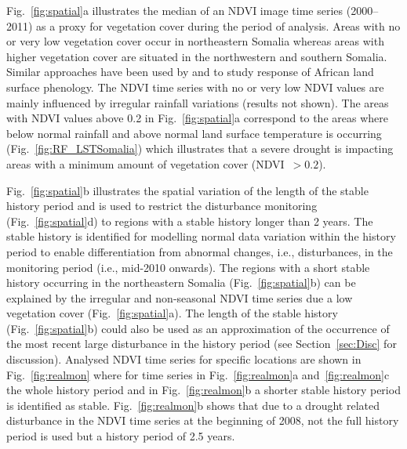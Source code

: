 \documentclass[authoryear,preprint,review,10pt]{elsarticle}
\begin{document}
Fig.~\ref{fig:spatial}a illustrates the median of an NDVI image time series (2000--2011) as a proxy for vegetation cover during the period of analysis. Areas with no or very low vegetation cover occur in northeastern Somalia whereas areas with higher vegetation cover are situated in the northwestern and southern Somalia. Similar approaches have been used by \citet{Brown:2010fq} and \citet{Vrieling:2011da} to study response of African land surface phenology. The NDVI time series with no or very low NDVI values are mainly influenced by irregular rainfall variations (results not shown). The areas with NDVI values above 0.2 in Fig.~\ref{fig:spatial}a correspond to the areas where below normal rainfall and above normal land surface temperature is occurring (Fig.~\ref{fig:RF_LSTSomalia}) which illustrates that a severe drought is impacting areas with a minimum amount of vegetation cover (NDVI~$> 0.2$). 

Fig.~\ref{fig:spatial}b illustrates the spatial variation of the length of the stable history period and is used to restrict the disturbance monitoring (Fig.~\ref{fig:spatial}d) to regions with a stable history longer than 2 years. The stable history is identified for modelling normal data variation within the history period to enable differentiation from abnormal changes, i.e., disturbances, in the monitoring period (i.e., mid-2010 onwards). The regions with a short stable history occurring in the northeastern Somalia (Fig.~\ref{fig:spatial}b) can be explained by the irregular and non-seasonal NDVI time series due a low vegetation cover (Fig.~\ref{fig:spatial}a). The length of the stable history (Fig.~\ref{fig:spatial}b) could also be used as an approximation of the occurrence of the most recent large disturbance in the history period (see Section~\ref{sec:Disc} for discussion). Analysed NDVI time series for specific locations are shown in Fig.~\ref{fig:realmon} where for time series in Fig.~\ref{fig:realmon}a and~\ref{fig:realmon}c the whole history period and in Fig.~\ref{fig:realmon}b a shorter stable history period is identified as stable. Fig.~\ref{fig:realmon}b shows that due to a drought related disturbance in the NDVI time series at the beginning of 2008, not the full history period is used but a history period of 2.5 years. 

\end{document}
